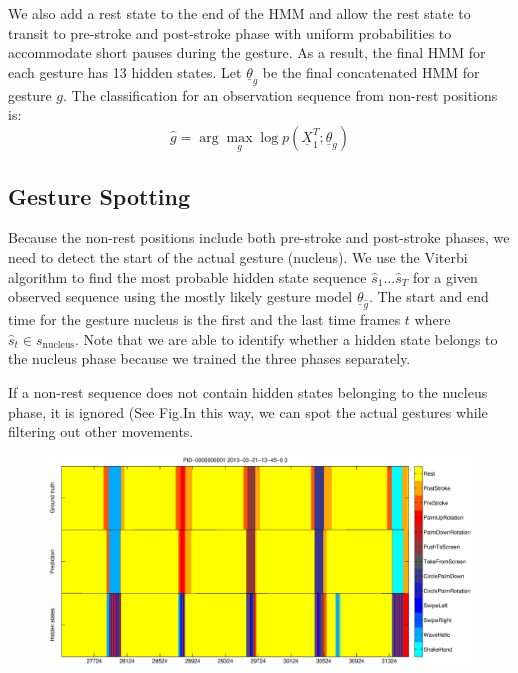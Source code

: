 \documentclass{acm_proc_article-sp}
\begin{document}
We also add a rest state to the end of the HMM and allow the rest state to transit to pre-stroke
and post-stroke phase with uniform probabilities to accommodate short pauses during the gesture.
As a result, the final HMM for each gesture has 13 hidden states.
Let $\underline{\theta}_g$ be the final concatenated HMM for gesture $g$. The classification
for an observation sequence from non-rest positions is:
\begin{displaymath}
\hat{g} = \arg\max_g\log p(\underline{X}_1^T; \underline{\theta}_g)
\end{displaymath}

\subsection{Gesture Spotting}
Because the non-rest positions include both pre-stroke and post-stroke phases, we need
to detect the start of the actual gesture (nucleus). We use the Viterbi algorithm
to find the most probable hidden state sequence $\hat{s}_1\ldots\hat{s}_T$ for a given observed sequence using 
the mostly likely gesture model $\underline{\theta}_{\hat{g}}$. The start and end time for the gesture nucleus is
the first and the last time frames $t$ where $\hat{s}_t\in s_{\text{nucleus}}$. Note that
we are able to identify whether a hidden state belongs to the nucleus phase because we trained the three phases
separately.

If a non-rest sequence does not contain hidden states belonging to the nucleus phase, it is ignored (See Fig.In
this way, we can spot the actual gestures while filtering out other movements.

\begin{figure}[tb]
\centering
\includegraphics[trim={3cm 3cm 3cm 0.5cm}, clip, width=1\columnwidth]{fig/01-3-3.eps}
\caption{}
\label{fig:decoding}
\end{figure}
\end{document}
